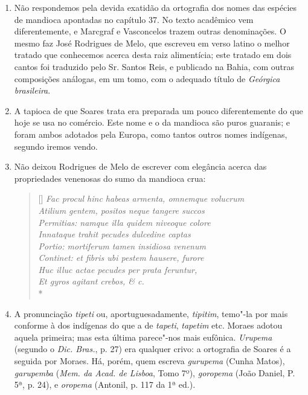 \begin{enumerate}
\item Não respondemos pela devida exatidão da ortografia dos nomes das espécies de 
mandioca apontadas no capítulo 37. No texto acadêmico vem diferentemente, e 
Marcgraf e Vasconcelos trazem outras denominações. O mesmo faz José Rodrigues de 
Melo, que escreveu em verso latino o melhor tratado que conhecemos acerca desta raiz 
alimentícia; este tratado em dois cantos foi traduzido pelo Sr. Santos Reis, e 
publicado na Bahia, com outras composições análogas, em um tomo, com o adequado 
título de \textit{Geórgica brasileira}.

\item A tapioca de que Soares trata era preparada um pouco diferentemente do que hoje 
se usa no comércio. Este nome e o da mandioca são puros guaranis; e foram ambos 
adotados pela Europa, como tantos outros nomes indígenas, segundo iremos vendo.

\item Não deixou Rodrigues de Melo de escrever com elegância acerca das 
propriedades venenosas do sumo da mandioca crua: 

\settowidth{\versewidth}{Fac procul hinc habeas armenta, omnemque volucrum}
\begin{verse}[\versewidth]
\textit{Fac procul hinc habeas armenta, omnemque volucrum \\
Atilium gentem, positos neque tangere succos \\
Permitias: namque illa quidem niveoque colore \\
Innataque trahit pecudes dulcedine captas \\
Portio: mortiferum tamen insidiosa venenum \\
Continet: et fibris ubi pestem hausere, furore \\
Huc illuc actae pecudes per prata feruntur, \\
Et gyros agitant crebos, \& c.}\\*
\end{verse}

\item  A pronunciação \textit{tipeti} ou, aportuguesadamente, \textit{tipitim}, temo"-la por
mais conforme à dos indígenas do que a de \textit{tapeti}, \textit{tapetim} etc. Moraes
adotou aquela primeira; mas esta última parece"-nos mais eufônica. \textit{Urupema}
(segundo o \textit{Dic. Bras.}, p. 27) era qualquer crivo: a ortografia de Soares é
a seguida por Moraes. Há, porém, quem escreva \textit{gurupema} (Cunha Matos), \textit{garupemba} 
(\textit{Mem. da Acad. de Lisboa}, Tomo 7º), \textit{goropema} (João Daniel, P. 5ª, p. 24), e \textit{oropema} 
(Antonil, p. 117 da 1ª ed.).


\end{enumerate}
